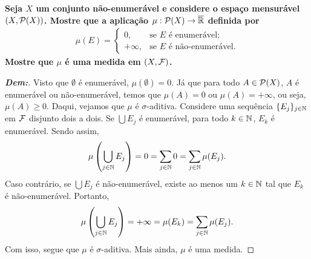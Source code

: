 \biglinend
\newpage 
{}
\myexe{\thedois}
\bigline
\textbf{Seja $X$ um conjunto não-enumerável e considere o espaço mensurável $(X, \mathcal P(X))$. 
Mostre que a aplicação $\mu: \mathcal P(X) \rightarrow \overline {\mathbb R}$ definida por 
\begin{align*}
  \mu(E) = \begin{cases}
    0, &\text{se $E$ é enumerável;}\\
    +\infty, &\text{se $E$ é não-enumerável.}
  \end{cases}
\end{align*}
Mostre que $\mu$ é uma medida em $(X, \mathcal F)$.}
\begin{proof}[\textbf{Dem:}]
Visto que $\emptyset$ é enumerável, $\mu(\emptyset) = 0$. Já que para todo $A \in \mathcal P(X)$, 
  $A$ é enumerável ou não-enumerável, temos que $\mu(A) = 0$ ou $\mu(A) = +\infty$, ou seja, 
  $\mu(A) \ge 0$. Daqui, vejamos que $\mu$ é $\sigma$-aditiva. Considere uma sequência 
  $\{E_j\}_{j \in \mathbb N}$ em $\mathcal F$ disjunto dois a dois. Se $\bigcup E_j$ é enumerável, 
  para todo $k \in \mathbb N$, $E_k$ é enumerável. Sendo assim, 
  \begin{align*}
    \mu\left(\bigcup\limits_{j \in \mathbb N} E_j\right) = 0 
    = \sum_{j \in \mathbb N} 0 = \sum_{j \in \mathbb N} \mu(E_j).
  \end{align*}
  Caso contrário, se $\bigcup E_j$ é não-enumerável, existe ao menos um $k \in \mathbb N$ 
  tal que $E_k$ é não-enumerável. Portanto, 
  \begin{align*}
    \mu\left(\bigcup_{j \in \mathbb N} E_j\right) = +\infty = \mu(E_k)
    = \sum_{j \in \mathbb N} \mu(E_j).
  \end{align*}
  Com isso, segue que $\mu$ é $\sigma$-aditiva. Mais ainda, $\mu$ é uma medida.
\end{proof}


